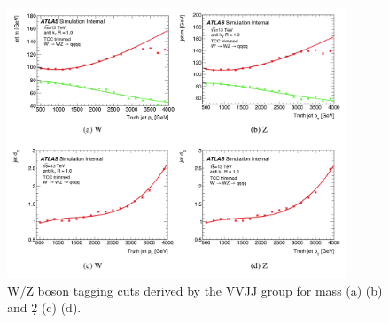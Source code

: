 \begin{figure}[htbp!]
\begin{center}
    \includegraphics[width=0.9\textwidth]{VVJJ_Mass_d2_WZ_cuts.png}
\end{center}
\caption{W/Z boson tagging cuts derived by the VVJJ group for mass (a) (b) and \d2 (c) (d).}
\label{fig:vvjj_wz_tagger_mass_d2_cuts}
\end{figure}

